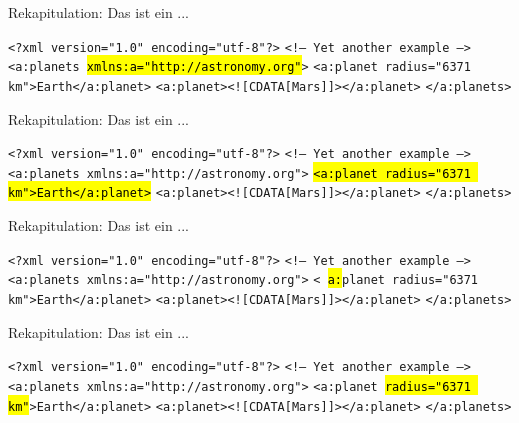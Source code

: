 \documentclass{beamer}
\makeatletter
\newcommand\SoulColor{%
	\let\set@color\beamerorig@set@color
	\let\reset@color\beamerorig@reset@color}
\makeatother
\begin{document}
\begin{frame}{Rekapitulation: Das ist ein ...}
	
	\texttt{<?xml version="1.0" encoding="utf-8"?>} \newline
	\texttt{<!-- Yet another example -->} \newline
	\texttt{<a:planets \SoulColor\hl{xmlns:a="http://astronomy.org"}>} \newline
	\texttt{<a:planet radius="6371 km">Earth</a:planet>} \newline
	\texttt{<a:planet><![CDATA[Mars]]></a:planet>} \newline
	\texttt{</a:planets>}
	
\end{frame}

\begin{frame}{Rekapitulation: Das ist ein ...}
	
	\texttt{<?xml version="1.0" encoding="utf-8"?>} \newline
	\texttt{<!-- Yet another example -->} \newline
	\texttt{<a:planets xmlns:a="http://astronomy.org">} \newline
	\SoulColor\hl{\texttt{<a:planet radius="6371 km">Earth</a:planet>}} \newline
	\texttt{<a:planet><![CDATA[Mars]]></a:planet>} \newline
	\texttt{</a:planets>}
	
\end{frame}

\begin{frame}{Rekapitulation: Das ist ein ...}
	
	\texttt{<?xml version="1.0" encoding="utf-8"?>} \newline
	\texttt{<!-- Yet another example -->} \newline
	\texttt{<a:planets xmlns:a="http://astronomy.org">} \newline
	\texttt{<\SoulColor\hl{a:}planet radius="6371 km">Earth</a:planet>} \newline
	\texttt{<a:planet><![CDATA[Mars]]></a:planet>} \newline
	\texttt{</a:planets>}
	
\end{frame}

\begin{frame}{Rekapitulation: Das ist ein ...}
	
	\texttt{<?xml version="1.0" encoding="utf-8"?>} \newline
	\texttt{<!-- Yet another example -->} \newline
	\texttt{<a:planets xmlns:a="http://astronomy.org">} \newline
	\texttt{<a:planet \SoulColor\hl{radius="6371 km"}>Earth</a:planet>} \newline
	\texttt{<a:planet><![CDATA[Mars]]></a:planet>} \newline
	\texttt{</a:planets>}
	
\end{frame}
\end{document}
